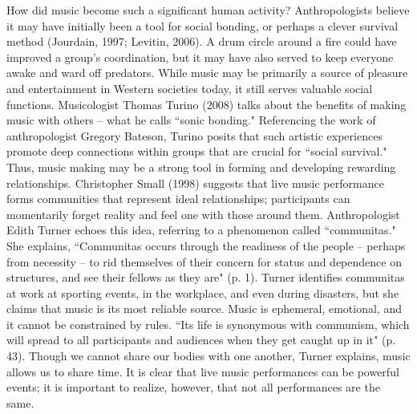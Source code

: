 How did music become such a significant human activity? Anthropologists believe it may have initially been a tool for social bonding, or perhaps a clever survival method (Jourdain, 1997; Levitin, 2006). A drum circle around a fire could have improved a group's coordination, but it may have also served to keep everyone awake and ward off predators. While music may be primarily a source of pleasure and entertainment in Western societies today, it still serves valuable social functions. Musicologist Thomas Turino (2008) talks about the benefits of making music with others -- what he calls ``sonic bonding." Referencing the work of anthropologist Gregory Bateson, Turino posits that such artistic experiences promote deep connections within groups that are crucial for ``social survival." Thus, music making may be a strong tool in forming and developing rewarding relationships. Christopher Small (1998) suggests that live music performance forms communities that represent ideal relationships; participants can momentarily forget reality and feel one with those around them. Anthropologist Edith Turner echoes this idea, referring to a phenomenon called ``communitas." She explains, ``Communitas occurs through the readiness of the people -- perhaps from necessity -- to rid themselves of their concern for status and dependence on structures, and see their fellows as they are" (p. 1). Turner identifies communitas at work at sporting events, in the workplace, and even during disasters, but she claims that music is its most reliable source. Music is ephemeral, emotional, and it cannot be constrained by rules. ``Its life is synonymous with communism, which will spread to all participants and audiences when they get caught up in it" (p. 43). Though we cannot share our bodies with one another, Turner explains, music allows us to share time. It is clear that live music performances can be powerful events; it is important to realize, however, that not all performances are the same.
